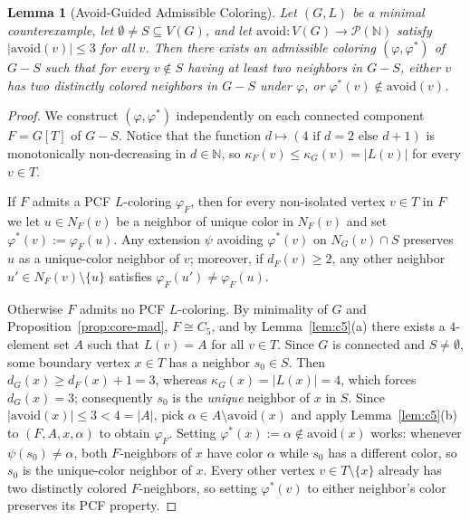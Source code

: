 \documentclass[11pt,a4paper]{article}
\newtheorem{lemma}[theorem]{Lemma}
\theoremstyle{definition}
\newcommand{\N}{\mathbb{N}}
\begin{document}
\begin{lemma}[Avoid-Guided Admissible Coloring]\label{lem:adm-avoid}
Let $(G, L)$ be a minimal counterexample, let $\emptyset \neq S \subseteq V(G)$, and let $\mathrm{avoid} : V(G) \to \mathcal{P}(\N)$ satisfy $|\mathrm{avoid}(v)| \le 3$ for all $v$. Then there exists an admissible coloring $(\varphi, \varphi^*)$ of $G - S$ such that for every $v \notin S$ having at least two neighbors in $G - S$, either $v$ has two distinctly colored neighbors in $G - S$ under $\varphi$, or $\varphi^*(v) \notin \mathrm{avoid}(v)$.
\end{lemma}

\begin{proof}
We construct $(\varphi, \varphi^*)$ independently on each connected component $F = G[T]$ of $G - S$. Notice that the function $d \mapsto (4\text{ if }d=2\text{ else }d+1)$ is monotonically non-decreasing in $d \in \N$, so $\kappa_F(v) \le \kappa_G(v) = |L(v)|$ for every $v \in T$.

If $F$ admits a PCF $L$-coloring $\varphi_F$, then for every non-isolated vertex $v \in T$ in $F$ we let $u \in N_F(v)$ be a neighbor of unique color in $N_F(v)$ and set $\varphi^*(v) := \varphi_F(u)$. Any extension $\psi$ avoiding $\varphi^*(v)$ on $N_G(v) \cap S$ preserves $u$ as a unique-color neighbor of $v$; moreover, if $d_F(v) \ge 2$, any other neighbor $u' \in N_F(v) \setminus \{u\}$ satisfies $\varphi_F(u') \neq \varphi_F(u)$.

Otherwise $F$ admits no PCF $L$-coloring. By minimality of $G$ and Proposition~\ref{prop:core-mad}, $F \cong C_5$, and by Lemma~\ref{lem:c5}(a) there exists a $4$-element set $A$ such that $L(v) = A$ for all $v \in T$. Since $G$ is connected and $S \neq \emptyset$, some boundary vertex $x \in T$ has a neighbor $s_0 \in S$. Then $d_G(x) \ge d_F(x) + 1 = 3$, whereas $\kappa_G(x) = |L(x)| = 4$, which forces $d_G(x) = 3$; consequently $s_0$ is the \emph{unique} neighbor of $x$ in $S$. Since $|\mathrm{avoid}(x)| \le 3 < 4 = |A|$, pick $\alpha \in A \setminus \mathrm{avoid}(x)$ and apply Lemma~\ref{lem:c5}(b) to $(F, A, x, \alpha)$ to obtain $\varphi_F$. Setting $\varphi^*(x) := \alpha \notin \mathrm{avoid}(x)$ works: whenever $\psi(s_0) \neq \alpha$, both $F$-neighbors of $x$ have color $\alpha$ while $s_0$ has a different color, so $s_0$ is the unique-color neighbor of $x$. Every other vertex $v \in T \setminus \{x\}$ already has two distinctly colored $F$-neighbors, so setting $\varphi^*(v)$ to either neighbor's color preserves its PCF property.
\end{proof}
\end{document}

